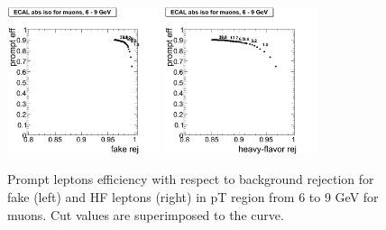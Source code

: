 \begin{figure}[htbp]
\begin{center}
 \includegraphics[width = 0.4\textwidth]{pictures/trackCut/bkgdRej_sigEff/muon_fake_ptCut1_ptCut2.png}
\includegraphics[width = 0.4\textwidth]{pictures/trackCut/bkgdRej_sigEff/muon_nonPrompt_ptCut1_ptCut2.png}
\caption{\small{Prompt leptons efficiency with respect to background 
rejection for fake (left) and HF leptons (right) in pT region
from 6 to 9 GeV for muons. 
Cut values are superimposed to the curve.}\label{fig:ecalrej_mu2}}
\end{center}
\end{figure}

